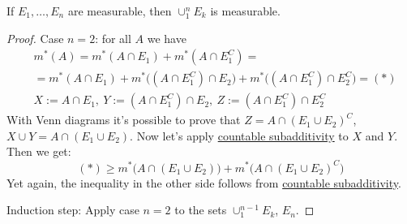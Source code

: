 \begin{proposition}  
    If $E_1, \dots, E_n$ are measurable, then 
    $\cup_{1}^n E_k$ is measurable.
\end{proposition}
\begin{proof}
    Case $n=2$:
    for all $A$ we have
    \begin{align*}
        &
        m^*(A) = m^*(A \cap E_1) +  m^*(A \cap E_1^C)
        =\\&=
        m^*(A \cap E_1) + m^*\bigl((A \cap E_1^C) \cap E_2\bigr) +
        m^*\bigl((A \cap E_1^C) \cap E_2^C\bigr) = (*)
        \\&
        X := A \cap E_1,\
        Y := (A \cap E_1^C) \cap E_2,\
        Z := (A \cap E_1^C) \cap E_2^C
    \end{align*}
    With Venn diagrams it's possible to prove that 
    $Z = A \cap (E_1 \cup E_2)^C$, $X \cup Y = A \cap (E_1 \cup E_2)$.
    Now let's apply \hyperref[the:countableSubadditivity]{countable subadditivity} to $X$ and $Y$. Then we get:
    \[
        (*) \ge m^*\bigl(A \cap (E_1 \cup E_2)\bigr) +
        m^*\bigl(A \cap (E_1 \cup E_2)^C\bigr)
    \]
    Yet again, the inequality in the other side follows from 
    \hyperref[the:countableSubadditivity]{countable subadditivity}.

    Induction step:
    Apply case $n=2$ to the sets 
    $\cup_{1}^{n - 1} E_k$, $E_n$.
\end{proof}